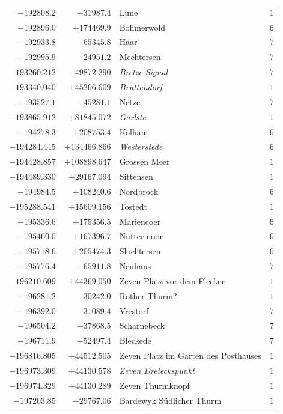 \begin{center}
\begin{tabular}{r|r|p{170pt}|r}
\(-192808.2\)&\(-31987.4\)&Lune&\(1\)\\
\(-192896.0\)&\(+174469.9\)&Bohmerwold&\(6\)\\
\(-192933.8\)&\(-65345.8\)&Haar&\(7\)\\
\(-192995.9\)&\(-24951.2\)&Mechtersen&\(7\)\\
\(-193260.212\)&\(-49872.290\)&\textit{Bretze Signal}&\(7\)\\
\(-193340.040\)&\(+45266.609\)&\textit{Brüttendorf}&\(1\)\\
\(-193527.1\)&\(-45281.1\)&Netze&\(7\)\\
\(-193865.912\)&\(+81845.072\)&\textit{Garlste}&\(1\)\\
\(-194278.3\)&\(+208753.4\)&Kolham&\(6\)\\
\(-194284.445\)&\(+134466.866\)&\textit{Westerstede}&\(6\)\\
\(-194428.857\)&\(+108898.647\)&Grossen Meer&\(1\)\\
\(-194489.330\)&\(+29167.094\)&Sittensen&\(1\)\\
\(-194984.5\)&\(+108240.6\)&Nordbrock&\(6\)\\
\(-195288.541\)&\(+15609.156\)&Tostedt&\(1\)\\
\(-195336.6\)&\(+175356.5\)&Mariencoer&\(6\)\\
\(-195460.0\)&\(+167396.7\)&Nuttermoor&\(6\)\\
\(-195718.6\)&\(+205474.3\)&Slochtersen&\(6\)\\
\(-195776.4\)&\(-65911.8\)&Neuhaus&\(7\)\\
\(-196210.609\)&\(+44369.050\)&Zeven Platz vor dem Flecken&\(1\)\\
\(-196281.2\)&\(-30242.0\)&Rother Thurm?&\(1\)\\
\(-196392.0\)&\(-31089.4\)&Vrestorf&\(7\)\\
\(-196504.2\)&\(-37868.5\)&Scharnebeck&\(7\)\\
\(-196711.9\)&\(-52497.4\)&Bleckede&\(7\)\\
\(-196816.805\)&\(+44512.505\)&Zeven Platz im Garten des Posthauses&\(1\)\\
\(-196973.309\)&\(+44130.578\)&\textit{Zeven Dreieckspunkt}&\(1\)\\
\(-196974.329\)&\(+44130.289\)&Zeven Thurmknopf&\(1\)\\
\(-197203.85\)&\(-29767.06\)&Bardewyk Südlicher Thurm&\(1\)\\
\hline\end{tabular}\endgroup\end{center}
